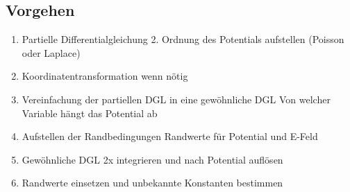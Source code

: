 \subsection{Vorgehen}
\begin{enumerate}
	\item Partielle Differentialgleichung 2. Ordnung des Potentials aufstellen (Poisson oder Laplace)
	\item Koordinatentransformation wenn nötig
	\item Vereinfachung der partiellen DGL in eine gewöhnliche DGL 
	\subitem Von welcher Variable hängt das Potential ab
	\item Aufstellen der Randbedingungen
	\subitem Randwerte für Potential und E-Feld
	\item Gewöhnliche DGL 2x integrieren und nach Potential auflösen
	\item Randwerte einsetzen und unbekannte Konstanten bestimmen
\end{enumerate}
\clearpage
\pagebreak
